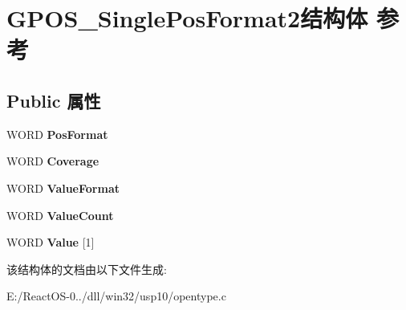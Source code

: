 \hypertarget{struct_g_p_o_s___single_pos_format2}{}\section{G\+P\+O\+S\+\_\+\+Single\+Pos\+Format2结构体 参考}
\label{struct_g_p_o_s___single_pos_format2}
\subsection*{Public 属性}
\begin{DoxyCompactItemize}
\item 
\mbox{\label{struct_g_p_o_s___single_pos_format2_a9b728e37b7536a690e7701532a43dc31}} 
W\+O\+RD {\bfseries Pos\+Format}
\item 
\mbox{\label{struct_g_p_o_s___single_pos_format2_aaee4940d9469443e3e3dbd503f134ba4}} 
W\+O\+RD {\bfseries Coverage}
\item 
\mbox{\label{struct_g_p_o_s___single_pos_format2_ae359109c1594f1fe07b2b4b659d0e1a3}} 
W\+O\+RD {\bfseries Value\+Format}
\item 
\mbox{\label{struct_g_p_o_s___single_pos_format2_a79d802b2785db0e660f66a7687c8922e}} 
W\+O\+RD {\bfseries Value\+Count}
\item 
\mbox{\label{struct_g_p_o_s___single_pos_format2_a5a911b6053ab6be2a0f9e9758651d48e}} 
W\+O\+RD {\bfseries Value} \mbox{[}1\mbox{]}
\end{DoxyCompactItemize}


该结构体的文档由以下文件生成\+:\begin{DoxyCompactItemize}
\item 
E\+:/\+React\+O\+S-\/0../dll/win32/usp10/opentype.\+c\end{DoxyCompactItemize}
